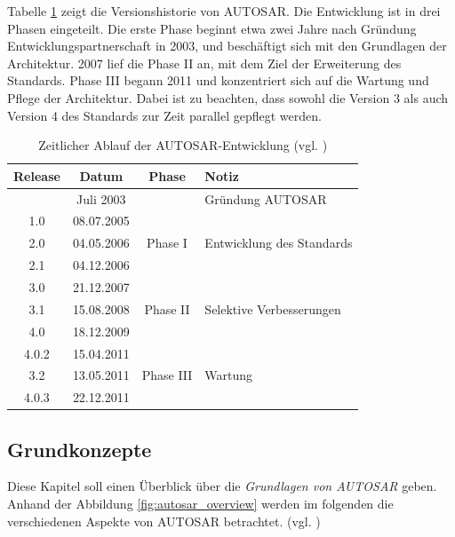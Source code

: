 \documentclass[
  a4paper,					    %
  twoside,
  DIV=calc,     				%
  bibliography=totoc,
  cleardoublepage=empty,
  ngerman,     					%
  final       					%
]{scrbook}
\begin{document}
Tabelle \ref{tab:timeline} zeigt die Versionshistorie von AUTOSAR. Die Entwicklung ist in drei Phasen eingeteilt. Die erste Phase beginnt etwa zwei Jahre nach Gründung Entwicklungspartnerschaft in 2003, und beschäftigt sich mit den Grundlagen der Architektur. 2007 lief die Phase II an, mit dem Ziel der Erweiterung des Standards. Phase III begann 2011 und konzentriert sich auf die Wartung und Pflege der Architektur. Dabei ist zu beachten, dass sowohl die Version 3 als auch Version 4 des Standards zur Zeit parallel gepflegt werden.

\begin{table}[h]
\center
\begin{tabular}[h]{c c c l}
\toprule
Release & Datum & Phase & Notiz\\
\midrule
      & Juli 2003  &  & Gründung AUTOSAR\\
\midrule
1.0   & 08.07.2005 & \multirow{3}{*}{Phase I} & \\
2.0	  & 04.05.2006 &  & Entwicklung des Standards\\
2.1	  & 04.12.2006 &  & \\
\midrule
3.0	  & 21.12.2007 & \multirow{3}{*}{Phase II} & \\
3.1	  & 15.08.2008 &  & Selektive Verbesserungen\\
4.0	  & 18.12.2009 &  & \\
\midrule
4.0.2 & 15.04.2011 & \multirow{3}{*}{Phase III} & \\
3.2	  & 13.05.2011 &  & Wartung\\
4.0.3 & 22.12.2011 &  & \\
\bottomrule
\end{tabular}
\caption{Zeitlicher Ablauf der AUTOSAR-Entwicklung (vgl. \cite{wiki:autosar_de}\cite{as_roadmap}\cite{as_background})}
\label{tab:timeline}
\end{table}








\subsection{Grundkonzepte}
\label{sec:Grundkonzepte}
Diese Kapitel soll einen Überblick über die \emph{Grundlagen von AUTOSAR} geben. Anhand der Abbildung \ref{fig:autosar_overview} werden im folgenden die verschiedenen Aspekte von AUTOSAR betrachtet. (vgl. \cite{autosar_techoverview})
\end{document}
